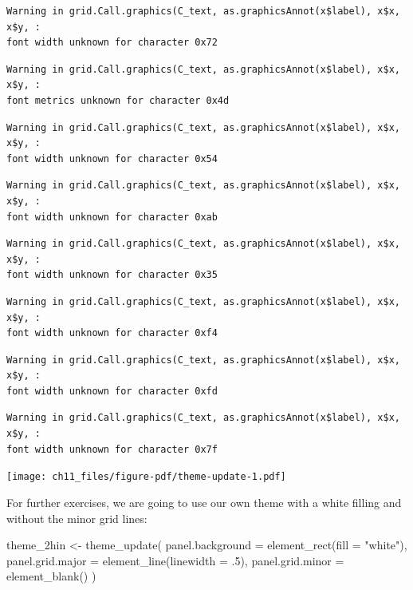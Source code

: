 \documentclass[
  letterpaper,
  DIV=11,
  numbers=noendperiod]{scrreprt}
\newenvironment{Shaded}{\begin{snugshade}}{\end{snugshade}}
\newcommand{\AttributeTok}[1]{\textcolor[rgb]{0.40,0.45,0.13}{#1}}
\newcommand{\DecValTok}[1]{\textcolor[rgb]{0.68,0.00,0.00}{#1}}
\newcommand{\FunctionTok}[1]{\textcolor[rgb]{0.28,0.35,0.67}{#1}}
\newcommand{\NormalTok}[1]{\textcolor[rgb]{0.00,0.23,0.31}{#1}}
\newcommand{\OtherTok}[1]{\textcolor[rgb]{0.00,0.23,0.31}{#1}}
\newcommand{\StringTok}[1]{\textcolor[rgb]{0.13,0.47,0.30}{#1}}
\begin{document}
\begin{verbatim}
Warning in grid.Call.graphics(C_text, as.graphicsAnnot(x$label), x$x, x$y, :
font width unknown for character 0x72
\end{verbatim}

\begin{verbatim}
Warning in grid.Call.graphics(C_text, as.graphicsAnnot(x$label), x$x, x$y, :
font metrics unknown for character 0x4d
\end{verbatim}

\begin{verbatim}
Warning in grid.Call.graphics(C_text, as.graphicsAnnot(x$label), x$x, x$y, :
font width unknown for character 0x54
\end{verbatim}

\begin{verbatim}
Warning in grid.Call.graphics(C_text, as.graphicsAnnot(x$label), x$x, x$y, :
font width unknown for character 0xab
\end{verbatim}

\begin{verbatim}
Warning in grid.Call.graphics(C_text, as.graphicsAnnot(x$label), x$x, x$y, :
font width unknown for character 0x35
\end{verbatim}

\begin{verbatim}
Warning in grid.Call.graphics(C_text, as.graphicsAnnot(x$label), x$x, x$y, :
font width unknown for character 0xf4
\end{verbatim}

\begin{verbatim}
Warning in grid.Call.graphics(C_text, as.graphicsAnnot(x$label), x$x, x$y, :
font width unknown for character 0xfd
\end{verbatim}

\begin{verbatim}
Warning in grid.Call.graphics(C_text, as.graphicsAnnot(x$label), x$x, x$y, :
font width unknown for character 0x7f
\end{verbatim}

\texttt{[image: ch11\_files/figure-pdf/theme-update-1.pdf]}

For further exercises, we are going to use our own theme with a white
filling and without the minor grid lines:

\begin{Shaded}
\begin{Highlighting}[]
\NormalTok{theme\_2hin }\OtherTok{\textless{}{-}} \FunctionTok{theme\_update}\NormalTok{(}
  \AttributeTok{panel.background =} \FunctionTok{element\_rect}\NormalTok{(}\AttributeTok{fill =} \StringTok{"white"}\NormalTok{),}
  \AttributeTok{panel.grid.major =} \FunctionTok{element\_line}\NormalTok{(}\AttributeTok{linewidth =}\NormalTok{ .}\DecValTok{5}\NormalTok{),}
  \AttributeTok{panel.grid.minor =} \FunctionTok{element\_blank}\NormalTok{()}
\NormalTok{)}
\end{Highlighting}
\end{Shaded}
\end{document}
